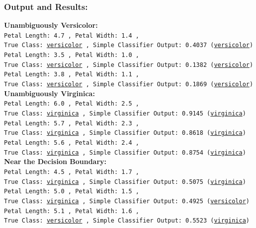 \documentclass{article} %
\begin{document}
\subsubsection*{Output and Results: }
\textbf{Unambiguously Versicolor:}\\
\texttt{Petal Length: 4.7 , Petal Width: 1.4 ,\\ True Class: \underline{versicolor} , Simple Classifier Output: 0.4037 (\underline{versicolor})\\
Petal Length: 3.5 , Petal Width: 1.0 ,\\ True Class: \underline{versicolor} , Simple Classifier Output: 0.1382 (\underline{versicolor})\\
Petal Length: 3.8 , Petal Width: 1.1 ,\\ True Class: \underline{versicolor} , Simple Classifier Output: 0.1869 (\underline{versicolor})\\
}
\textbf{Unambiguously Virginica:}\\
\texttt{Petal Length: 6.0 , Petal Width: 2.5 ,\\ True Class: \underline{virginica} , Simple Classifier Output: 0.9145 (\underline{virginica})\\
Petal Length: 5.7 , Petal Width: 2.3 ,\\ True Class: \underline{virginica} , Simple Classifier Output: 0.8618 (\underline{virginica})\\
Petal Length: 5.6 , Petal Width: 2.4 ,\\ True Class: \underline{virginica} , Simple Classifier Output: 0.8754 (\underline{virginica})\\
}
\textbf{Near the Decision Boundary:}\\
\texttt{Petal Length: 4.5 , Petal Width: 1.7 ,\\ True Class: \underline{virginica} , Simple Classifier Output: 0.5075 (\underline{virginica})\\
Petal Length: 5.0 , Petal Width: 1.5 ,\\ True Class: \underline{virginica} , Simple Classifier Output: 0.4925 (\underline{versicolor})\\
Petal Length: 5.1 , Petal Width: 1.6 ,\\ True Class: \underline{versicolor} , Simple Classifier Output: 0.5523 (\underline{virginica})
}\\
\linebreak
\end{document}
